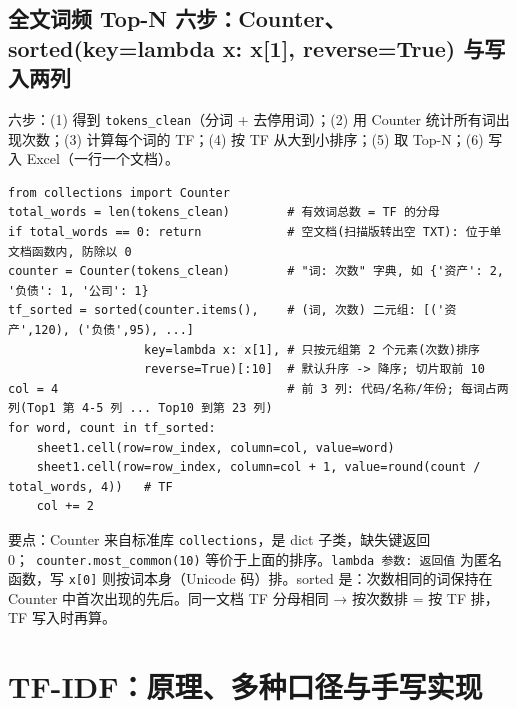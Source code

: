 \subsection{全文词频 Top-N 六步：Counter、sorted(key=lambda x: x[1], reverse=True) 与写入两列}
六步：(1) 得到 \texttt{tokens\_clean}（分词 + 去停用词）；(2) 用 Counter 统计所有词出现次数；(3) 计算每个词的 TF；(4) 按 TF 从大到小排序；(5) 取 Top-N；(6) 写入 Excel（一行一个文档）。
\begin{lstlisting}[style=pyD08a]
from collections import Counter
total_words = len(tokens_clean)        # 有效词总数 = TF 的分母
if total_words == 0: return            # 空文档(扫描版转出空 TXT): 位于单文档函数内, 防除以 0
counter = Counter(tokens_clean)        # "词: 次数" 字典, 如 {'资产': 2, '负债': 1, '公司': 1}
tf_sorted = sorted(counter.items(),    # (词, 次数) 二元组: [('资产',120), ('负债',95), ...]
                   key=lambda x: x[1], # 只按元组第 2 个元素(次数)排序
                   reverse=True)[:10]  # 默认升序 -> 降序; 切片取前 10
col = 4                                # 前 3 列: 代码/名称/年份; 每词占两列(Top1 第 4-5 列 ... Top10 到第 23 列)
for word, count in tf_sorted:
    sheet1.cell(row=row_index, column=col, value=word)
    sheet1.cell(row=row_index, column=col + 1, value=round(count / total_words, 4))   # TF
    col += 2
\end{lstlisting}
要点：Counter 来自标准库 \texttt{collections}，是 dict 子类，缺失键返回 0；\tagext\ \texttt{counter.most\_common(10)} 等价于上面的排序。\texttt{lambda 参数: 返回值} 为匿名函数，写 \texttt{x[0]} 则按词本身（Unicode 码）排。sorted 是：次数相同的词保持在 Counter 中首次出现的先后。同一文档 TF 分母相同 → 按次数排 = 按 TF 排，TF 写入时再算。

\section{TF-IDF：原理、多种口径与手写实现}

